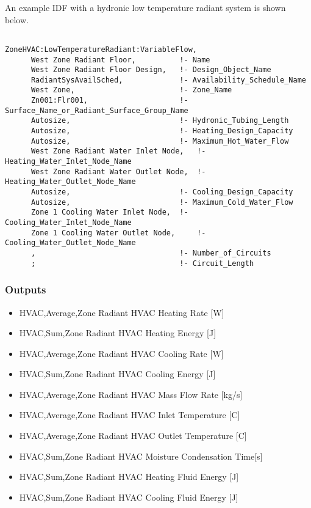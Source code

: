 An example IDF with a hydronic low temperature radiant system is shown below.

\begin{lstlisting}

ZoneHVAC:LowTemperatureRadiant:VariableFlow,
      West Zone Radiant Floor,          !- Name
      West Zone Radiant Floor Design,   !- Design_Object_Name
      RadiantSysAvailSched,             !- Availability_Schedule_Name
      West Zone,                        !- Zone_Name
      Zn001:Flr001,                     !- Surface_Name_or_Radiant_Surface_Group_Name
      Autosize,                         !- Hydronic_Tubing_Length
      Autosize,                         !- Heating_Design_Capacity
      Autosize,                         !- Maximum_Hot_Water_Flow
      West Zone Radiant Water Inlet Node,   !- Heating_Water_Inlet_Node_Name
      West Zone Radiant Water Outlet Node,  !- Heating_Water_Outlet_Node_Name
      Autosize,                         !- Cooling_Design_Capacity
      Autosize,                         !- Maximum_Cold_Water_Flow
      Zone 1 Cooling Water Inlet Node,  !- Cooling_Water_Inlet_Node_Name
      Zone 1 Cooling Water Outlet Node,     !- Cooling_Water_Outlet_Node_Name
      ,                                 !- Number_of_Circuits
      ;                                 !- Circuit_Length
\end{lstlisting}


\subsubsection{Outputs}\label{outputs-5-007}

\begin{itemize}
\item
  HVAC,Average,Zone Radiant HVAC Heating Rate {[}W{]}
\item
  HVAC,Sum,Zone Radiant HVAC Heating Energy {[}J{]}
\item
  HVAC,Average,Zone Radiant HVAC Cooling Rate {[}W{]}
\item
  HVAC,Sum,Zone Radiant HVAC Cooling Energy {[}J{]}
\item
  HVAC,Average,Zone Radiant HVAC Mass Flow Rate {[}kg/s{]}
\item
  HVAC,Average,Zone Radiant HVAC Inlet Temperature {[}C{]}
\item
  HVAC,Average,Zone Radiant HVAC Outlet Temperature {[}C{]}
\item
  HVAC,Sum,Zone Radiant HVAC Moisture Condensation Time{[}s{]}
\item
  HVAC,Sum,Zone Radiant HVAC Heating Fluid Energy {[}J{]}
\item
  HVAC,Sum,Zone Radiant HVAC Cooling Fluid Energy {[}J{]}
\end{itemize}

